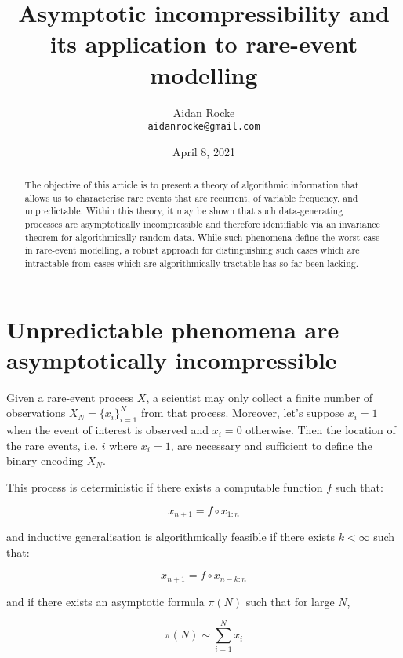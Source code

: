 \documentclass{article}
\title{Asymptotic incompressibility and its application to rare-event modelling}
\date{April 8, 2021}
\author{%
  Aidan Rocke\\
  \texttt{aidanrocke@gmail.com} \\
}
\begin{document}

\maketitle

\begin{abstract}
   The objective of this article is to present a theory of algorithmic information that allows us to characterise rare events that are recurrent, of variable frequency, and unpredictable. Within this theory, it may be shown that such data-generating processes are asymptotically incompressible and therefore identifiable via an invariance theorem for 
   algorithmically random data. While such phenomena define the worst case in rare-event modelling, a robust approach for distinguishing such cases which are intractable from cases which are algorithmically tractable has so far been lacking. 
   \end{abstract}

\section{Unpredictable phenomena are asymptotically incompressible}

Given a rare-event process $X$, a scientist may only collect a finite number of observations $X_N = \{x_i\}_{i=1}^N$ from that process. Moreover, let's suppose $x_i = 1$ when the event of interest is observed and $x_i=0$ otherwise. Then the location of the rare events, i.e. $i$ where $x_i=1$, are necessary and sufficient to define the binary encoding $X_N$.

This process is deterministic if there exists a computable function $f$ such that: 

\begin{equation}
x_{n+1} = f \circ x_{1:n}	
\end{equation}

and inductive generalisation is algorithmically feasible if there exists $k < \infty$ such that: 

\begin{equation}
x_{n+1} = f \circ x_{n-k:n}	
\end{equation}

and if there exists an asymptotic formula $\pi(N)$ such that for large $N$, 

\begin{equation}
\pi(N) \sim \sum_{i=1}^N x_i	
\end{equation}
\end{document}
